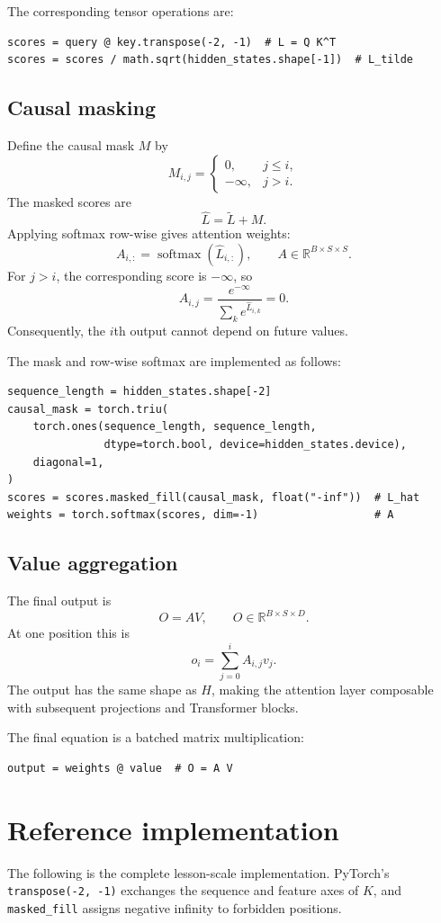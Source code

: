 \documentclass[11pt]{article}
\begin{document}
The corresponding tensor operations are:

\begin{lstlisting}
scores = query @ key.transpose(-2, -1)  # L = Q K^T
scores = scores / math.sqrt(hidden_states.shape[-1])  # L_tilde
\end{lstlisting}

\subsection{Causal masking}
Define the causal mask $M$ by
\[
M_{i,j}=\begin{cases}
0,&j\leq i,\\
-\infty,&j>i.
\end{cases}
\]
The masked scores are
\[
\widehat{L}=\widetilde{L}+M.
\]
Applying softmax row-wise gives attention weights:
\[
A_{i,:}=\operatorname{softmax}(\widehat{L}_{i,:}),
\qquad A\in\mathbb{R}^{B\times S\times S}.
\]
For $j>i$, the corresponding score is $-\infty$, so
\[
A_{i,j}=\frac{e^{-\infty}}{\sum_k e^{\widehat{L}_{i,k}}}=0.
\]
Consequently, the $i$th output cannot depend on future values.

The mask and row-wise softmax are implemented as follows:

\begin{lstlisting}
sequence_length = hidden_states.shape[-2]
causal_mask = torch.triu(
    torch.ones(sequence_length, sequence_length,
               dtype=torch.bool, device=hidden_states.device),
    diagonal=1,
)
scores = scores.masked_fill(causal_mask, float("-inf"))  # L_hat
weights = torch.softmax(scores, dim=-1)                  # A
\end{lstlisting}

\subsection{Value aggregation}
The final output is
\[
O=AV,
\qquad O\in\mathbb{R}^{B\times S\times D}.
\]
At one position this is
\[
o_i=\sum_{j=0}^{i}A_{i,j}v_j.
\]
The output has the same shape as $H$, making the attention layer composable
with subsequent projections and Transformer blocks.

The final equation is a batched matrix multiplication:

\begin{lstlisting}
output = weights @ value  # O = A V
\end{lstlisting}

\section{Reference implementation}
The following is the complete lesson-scale implementation. PyTorch's
\texttt{transpose(-2, -1)} exchanges the sequence and feature axes of $K$,
and \texttt{masked\_fill} assigns negative infinity to forbidden positions.
\end{document}
